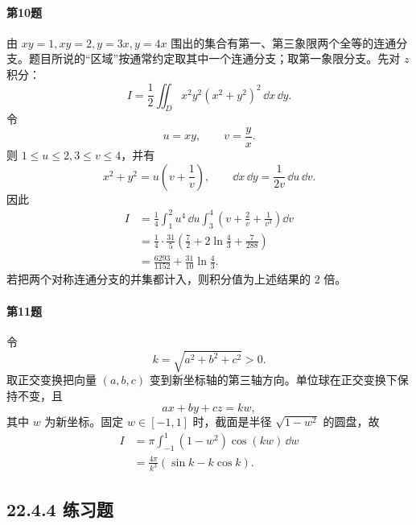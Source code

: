 \paragraph{第10题}
\begin{xsolution}
由 $xy=1,xy=2,y=3x,y=4x$ 围出的集合有第一、第三象限两个全等的连通分支。题目所说的“区域”按通常约定取其中一个连通分支；取第一象限分支。先对 $z$ 积分：
\[
 I=\frac12\iint_Dx^2y^2(x^2+y^2)^2\,\dd x\,\dd y.
\]
令
\[
 u=xy,
 \qquad v=\frac yx.
\]
则 $1\le u\le2,3\le v\le4$，并有
\[
 x^2+y^2=u\left(v+\frac1v\right),
 \qquad
 \dd x\,\dd y=\frac1{2v}\,\dd u\,\dd v.
\]
因此
\begin{align*}
 I&=\frac14\int_1^2u^4\,\dd u
 \int_3^4\left(v+\frac2v+\frac1{v^3}\right)\dd v\\
 &=\frac14\cdot\frac{31}{5}
 \left(\frac72+2\ln\frac43+\frac7{288}\right)\\
 &=\boxed{\frac{6293}{1152}+\frac{31}{10}\ln\frac43}.
\end{align*}
若把两个对称连通分支的并集都计入，则积分值为上述结果的 $2$ 倍。
\end{xsolution}

\paragraph{第11题}
\begin{xsolution}
令
\[
 k=\sqrt{a^2+b^2+c^2}>0.
\]
取正交变换把向量 $(a,b,c)$ 变到新坐标轴的第三轴方向。单位球在正交变换下保持不变，且
\[
 ax+by+cz=kw,
\]
其中 $w$ 为新坐标。固定 $w\in[-1,1]$ 时，截面是半径 $\sqrt{1-w^2}$ 的圆盘，故
\begin{align*}
 I&=\pi\int_{-1}^1(1-w^2)\cos(kw)\,\dd w\\
 &=\boxed{\frac{4\pi}{k^3}(\sin k-k\cos k)}.
\end{align*}
\end{xsolution}

\subsection*{22.4.4 练习题}

